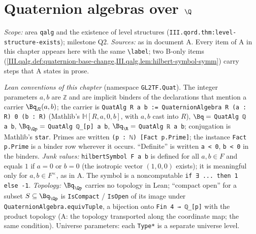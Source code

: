 
\chapter{Quaternion algebras over $\Q$}\label{ch:ch-iii-06-quatalg}

\noindent\emph{Scope:} area \texttt{qalg} and the existence of level structures (\texttt{III.qord.thm:level-structure-exists}); milestone Q2.
\emph{Sources:} as in document A. Every item of A in this chapter appears here with the same \texttt{\textbackslash label}; two B-only items
(\cref{III.qalg.def:quaternion-base-change,III.qalg.lem:hilbert-symbol-symm}) carry steps that A states in prose.

\noindent\emph{Lean conventions of this chapter} (namespace \texttt{GL2TF.Quat}). The integer parameters $a,b$ are \texttt{ℤ} and are implicit binders of the
declarations that mention a carrier $\Bq_R(a,b)$; the carrier is \texttt{QuatAlg R a b := QuaternionAlgebra R (a : R) 0 (b : R)} (Mathlib's $\mathbb H[R,a,0,b]$, with
$a,b$ cast into $R$), $\Bq=$ \texttt{QuatAlg ℚ a b}, $\Bq_{\Qp}=$ \texttt{QuatAlg ℚ\_[p] a b}, $\Bq_\R=$ \texttt{QuatAlg ℝ a b}; conjugation is Mathlib's \texttt{star}.
Primes are written \texttt{(p : ℕ) [Fact p.Prime]}; the instance \texttt{Fact p.Prime} is a binder row wherever it occurs. ``Definite'' is written \texttt{a < 0}, \texttt{b < 0} in
the binders. \emph{Junk values:} \texttt{hilbertSymbol F a b} is defined for all $a,b\in F$ and equals $1$ if $a=0$ or $b=0$ (the isotropic vector $(1,0,0)$ exists); it is meaningful
only for $a,b\in F^\times$, as in A. The symbol is a noncomputable \texttt{if ∃ ... then 1 else -1}. \emph{Topology:} $\Bq_{\Qp}$ carries no topology in Lean; ``compact open'' for a subset
$S\subseteq\Bq_{\Qp}$ is \texttt{IsCompact} / \texttt{IsOpen} of its image under \texttt{QuaternionAlgebra.equivTuple}, a bijection onto \texttt{Fin 4 → ℚ\_[p]} with the product topology
(A: the topology transported along the coordinate map; the same condition). Universe parameters: each \texttt{Type*} is a separate universe level.

